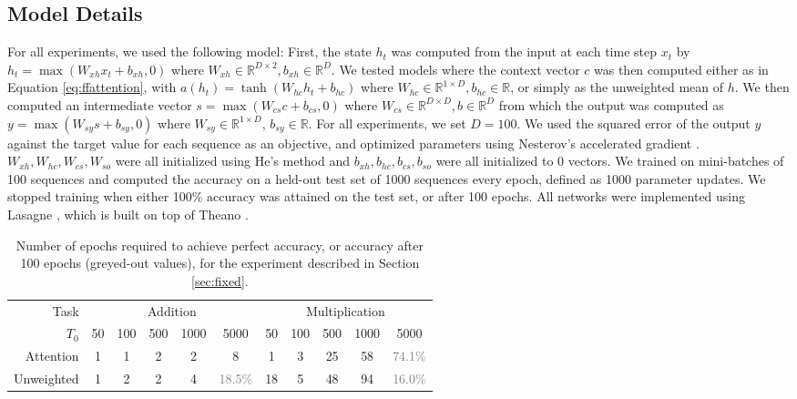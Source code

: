 \documentclass{article} %
\begin{document}
\subsection{Model Details}

For all experiments, we used the following model:
First, the state $h_t$ was computed from the input at each time step $x_t$ by $h_t = \max(W_{xh}x_t + b_{xh}, 0)$ where $W_{xh} \in \mathbb{R}^{D \times 2}, b_{xh} \in \mathbb{R}^D$.
We tested models where the context vector $c$ was then computed either as in Equation \ref{eq:ffattention}, with $a(h_t) =\tanh(W_{hc}h_t + b_{hc})$ where $W_{hc} \in \mathbb{R}^{1 \times D}, b_{hc} \in \mathbb{R}$, or simply as the unweighted mean of $h$.
We then computed an intermediate vector $s = \max(W_{cs}c + b_{cs}, 0)$ where $W_{cs} \in \mathbb{R}^{D \times D}, b \in \mathbb{R}^D$ from which the output was computed as $y = \max(W_{sy}s + b_{sy}, 0)$ where $W_{sy} \in \mathbb{R}^{1 \times D}$, $b_{sy} \in \mathbb{R}$.
For all experiments, we set $D = 100$.
We used the squared error of the output $y$ against the target value for each sequence as an objective, and optimized parameters using Nesterov's accelerated gradient \cite{sutskever2013importance}.
$W_{xh}, W_{hc}, W_{cs}, W_{so}$ were all initialized using He's method \cite{he2015delving} and $b_{xh}, b_{hc}, b_{cs}, b_{so}$ were all initialized to 0 vectors.
We trained on mini-batches of 100 sequences and computed the accuracy on a held-out test set of 1000 sequences every epoch, defined as 1000 parameter updates.
We stopped training when either 100\% accuracy was attained on the test set, or after 100 epochs.
All networks were implemented using Lasagne \cite{dieleman2015lasagne}, which is built on top of Theano \cite{bastien2012theano,bergstra2010theano}.

\begin{table}
  \centering
  \small
  \begin{tabular}{r c c c c c c c c c c}
    \toprule
    Task & \multicolumn{5}{c}{Addition} & \multicolumn{5}{c}{Multiplication} \\
    $T_0$ & 50 & 100 & 500 & 1000 & 5000 & 50 & 100 & 500 & 1000 & 5000 \\
    \cmidrule(r){2-6}
    \cmidrule(r){7-11}
    Attention & 1 & 1 & 2 & 2 & 8 & 1 & 3 & 25 & 58 & \textcolor{gray}{74.1\%} \\
    Unweighted & 1 & 2 & 2 & 4 & \textcolor{gray}{18.5\%} & 18 & 5 & 48 & 94 & \textcolor{gray}{16.0\%} \\
    \bottomrule
  \end{tabular}
  \caption{Number of epochs required to achieve perfect accuracy, or accuracy after 100 epochs (greyed-out values), for the experiment described in Section \ref{sec:fixed}.}
  \label{tab:fixed}
\end{table}
\setlength{\textfloatsep}{14pt}
\end{document}
